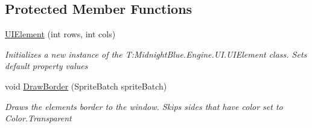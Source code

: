 \subsection*{Protected Member Functions}
\begin{DoxyCompactItemize}
\item 
\hyperlink{class_midnight_blue_1_1_engine_1_1_u_i_1_1_u_i_element_a89589f3049d81f74716e979f9db8b6d5}{U\+I\+Element} (int rows, int cols)
\begin{DoxyCompactList}\small\item\em Initializes a new instance of the T\+:\+Midnight\+Blue.\+Engine.\+U\+I.\+U\+I\+Element class. Sets default property values \end{DoxyCompactList}\item 
void \hyperlink{class_midnight_blue_1_1_engine_1_1_u_i_1_1_u_i_element_ae92b745064ca9810ce516d884f701e0e}{Draw\+Border} (Sprite\+Batch sprite\+Batch)
\begin{DoxyCompactList}\small\item\em Draws the elements border to the window. Skips sides that have color set to Color.\+Transparent \end{DoxyCompactList}\end{DoxyCompactItemize}
